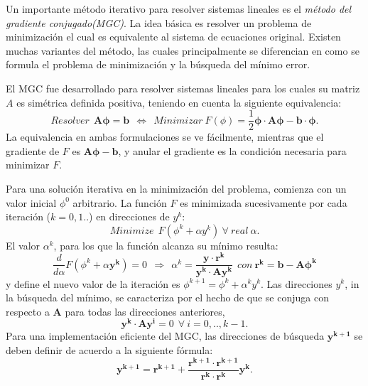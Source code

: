 \documentclass[a4paper,10pt, oneside]{book}
\begin{document}
Un importante método iterativo para resolver sistemas lineales es el \textit{método del gradiente conjugado(MGC)}. La idea básica es resolver un problema de minimización el cual es equivalente al sistema de ecuaciones original. Existen muchas variantes del método, las cuales principalmente se diferencian en como se formula el problema de minimización y la búsqueda del mínimo error.

El MGC fue desarrollado para resolver sistemas lineales para los cuales su matriz $A$ es simétrica definida positiva, teniendo en cuenta la siguiente equivalencia:
\begin{equation}
	Resolver ~~ \mathbf{A \phi = b} ~~ \Leftrightarrow ~~ Minimizar ~ F(\phi) = \frac12 \mathbf{\phi \cdot A \phi - b \cdot \phi}. \nonumber
\end{equation}
La equivalencia en ambas formulaciones se ve fácilmente, mientras que el gradiente de $F$ es $\mathbf{A \phi - b}$, y anular el gradiente es la condición necesaria para minimizar $F$.

Para una solución iterativa en la minimización del problema, comienza con un valor inicial $\phi^0$ arbitrario. La función $F$ es minimizada sucesivamente por cada iteración ($k=0,1..$) en direcciones de $y^k$:
\begin{equation}
	Minimize ~~ F(\phi^k + \alpha y^k) ~ \forall ~ real ~ \alpha. \nonumber
\end{equation}
El valor $\alpha^k$, para los que la función alcanza su mínimo resulta:
\begin{equation}
	\frac{d}{d \alpha} F(\phi^k + \alpha \mathbf{y^k}) = 0 ~~ \Rightarrow ~~ \alpha^k = \frac{\mathbf{y \cdot r^k}}{\mathbf{y^k \cdot A y^k}} ~~ con ~ \mathbf{r^k = b - A \phi^k} \nonumber
\end{equation}
y define el nuevo valor de la iteración es $\phi^{k+1} = \phi^k + \alpha^k y^k$. Las direcciones $y^k$, in la búsqueda del mínimo, se caracteriza por el hecho de que se conjuga con respecto a $\mathbf{A}$ para todas las direcciones anteriores,
\begin{equation}
	\mathbf{y^k \cdot A y^i} = 0 ~~ \forall ~ i=0,..,k-1. \nonumber
\end{equation}
Para una implementación eficiente del MGC, las direcciones de búsqueda $\mathbf{y^{k+1}}$ se deben definir de acuerdo a la siguiente fórmula:
\begin{equation}
	\mathbf{y^{k+1}} = \mathbf{r^{k+1}} + \frac{\mathbf{r^{k+1} \cdot r^{k+1}}}{\mathbf{r^k \cdot r^k}} \mathbf{y^{k}}. \nonumber
\end{equation}
\end{document}

